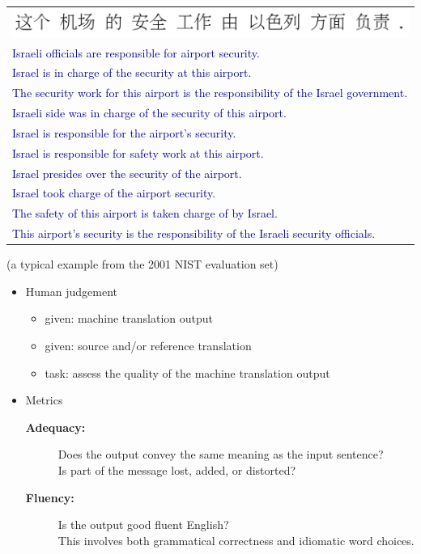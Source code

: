 \documentclass[landscape]{slides}
\newcommand{\example}[1]{\textcolor{darkblue}{\rm #1}}
\begin{document}
\vspace{5mm}
\begin{center}\example{
\begin{tabular}{l}
\includegraphics[width=18cm]{chinese-israel-airport-security.png}\\
Israeli officials are responsible for airport security.\\
Israel is in charge of the security at this airport.\\
The security work for this airport is the responsibility of the Israel government.\\
Israeli side was in charge of the security of this airport.\\
Israel is responsible for the airport's security.\\
Israel is responsible for safety work at this airport.\\
Israel presides over the security of the airport.\\
Israel took charge of the airport security.\\
The safety of this airport is taken charge of by Israel.\\
This airport's security is the responsibility of the Israeli security officials.
\end{tabular}
}

(a typical example from the 2001 NIST evaluation set)
\end{center}


\vspace{10mm}
\begin{itemize}
\item Human judgement
\begin{itemize}
\item given: machine translation output
\item given: source and/or reference translation
\item task: assess the quality of the machine translation output
\end{itemize}
\item Metrics
\begin{description}
\item[{\bf Adequacy:}] Does the output convey the same meaning as the input sentence?\\ Is part of the message lost, added, or distorted?\vspace{3mm}
\item[{\bf Fluency:}] Is the output good fluent English?\\ This involves both grammatical correctness and idiomatic word choices. \vspace{3mm}
\end{description}
\end{itemize}
\end{document}
